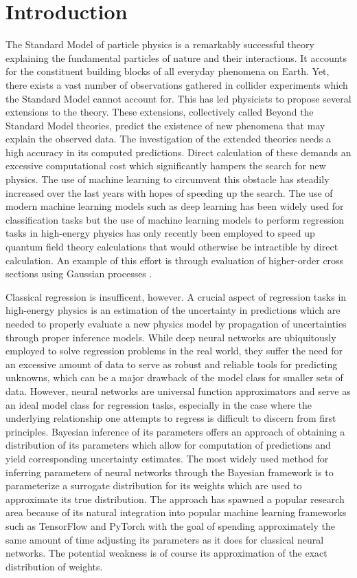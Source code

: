 \chapter*{Introduction}


The Standard Model of particle physics is a remarkably successful theory explaining the fundamental particles of nature and their interactions. It accounts for the constituent building blocks of all everyday phenomena on Earth. Yet, there exists a vast number of observations gathered in collider experiments which the Standard Model cannot account for. 
This has led physicists to propose several extensions to the theory.
These extensions, collectively called Beyond the Standard Model theories, predict the existence of new phenomena that may explain the observed data. The investigation of the extended theories needs a high accuracy in its computed predictions. Direct calculation of these demands an excessive computational cost which significantly hampers the search for new physics. The use of machine learning to 
circumvent this obstacle has steadily increased over the last years with hopes of speeding up the search. The use of modern machine learning models such as deep learning has been widely used for classification tasks but the use of machine learning models to perform regression tasks in high-energy physics has only recently been employed to speed up quantum field theory calculations that would otherwise be intractible by direct calculation. An example of this effort is through evaluation of higher-order cross sections using Gaussian processes \cite{xsec}. 

Classical regression is insufficent, however. A crucial aspect of regression tasks in high-energy physics is an estimation of the uncertainty in predictions which are needed to properly evaluate a new physics model by propagation of uncertainties through proper inference models. While deep neural networks are ubiquitously employed to solve regression problems in the real world, they suffer the need for an excessive amount of data to serve as robust and reliable tools for predicting unknowns, which can be a major drawback of the model class for smaller sets of data. However, neural networks are universal function approximators and serve as an ideal model class for regression tasks, especially in the case where the underlying relationship one attempts to regress is difficult to discern from first principles. Bayesian inference of its parameters offers an approach of obtaining a distribution of its parameters which allow for computation of predictions and yield corresponding uncertainty estimates. The most widely used method for inferring parameters of neural networks through the Bayesian framework is to parameterize a surrogate distribution for its weights which are used to approximate its true distribution. The approach has spawned a popular research area because of its natural integration into popular machine learning frameworks such as TensorFlow and PyTorch with the goal of spending approximately the same amount of time adjusting its parameters as it does for classical neural networks. The potential weakness is of course its approximation of the exact distribution of weights. 


